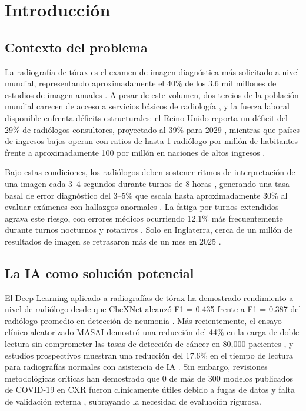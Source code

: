 \section{Introducci\'on}
\label{sec:introduction}

\subsection{Contexto del problema}

La radiograf\'ia de t\'orax es el examen de imagen diagn\'ostica m\'as solicitado a nivel mundial, representando aproximadamente el 40\% de los 3.6 mil millones de estudios de imagen anuales \cite{who2016xray, ahmad2023cxr}. A pesar de este volumen, dos tercios de la poblaci\'on mundial carecen de acceso a servicios b\'asicos de radiolog\'ia \cite{who2023imaging}, y la fuerza laboral disponible enfrenta d\'eficits estructurales: el Reino Unido reporta un d\'eficit del 29\% de radi\'ologos consultores, proyectado al 39\% para 2029 \cite{rcr2025census}, mientras que pa\'ises de ingresos bajos operan con ratios de hasta 1 radi\'ologo por mill\'on de habitantes frente a aproximadamente 100 por mill\'on en naciones de altos ingresos \cite{mollura2020ai}.

Bajo estas condiciones, los radi\'ologos deben sostener ritmos de interpretaci\'on de una imagen cada 3--4 segundos durante turnos de 8 horas \cite{mcdonald2015workload}, generando una tasa basal de error diagn\'ostico del 3--5\% que escala hasta aproximadamente 30\% al evaluar ex\'amenes con hallazgos anormales \cite{bruno2015error, brady2017error}. La fatiga por turnos extendidos agrava este riesgo, con errores m\'edicos ocurriendo 12.1\% m\'as frecuentemente durante turnos nocturnos y rotativos \cite{ahrq2024fatigue}. Solo en Inglaterra, cerca de un mill\'on de resultados de imagen se retrasaron m\'as de un mes en 2025 \cite{rcr2025census}.

\subsection{La IA como soluci\'on potencial}

El Deep Learning aplicado a radiograf\'ias de t\'orax ha demostrado rendimiento a nivel de radi\'ologo desde que CheXNet alcanz\'o F1 = 0.435 frente a F1 = 0.387 del radi\'ologo promedio en detecci\'on de neumon\'ia \cite{rajpurkar2017chexnet}. M\'as recientemente, el ensayo cl\'inico aleatorizado MASAI demostr\'o una reducci\'on del 44\% en la carga de doble lectura sin comprometer las tasas de detecci\'on de c\'ancer en 80,000 pacientes \cite{lang2023masai}, y estudios prospectivos muestran una reducci\'on del 17.6\% en el tiempo de lectura para radiograf\'ias normales con asistencia de IA \cite{shin2023ai}. Sin embargo, revisiones metodol\'ogicas cr\'iticas han demostrado que 0 de m\'as de 300 modelos publicados de COVID-19 en CXR fueron cl\'inicamente \'utiles debido a fugas de datos y falta de validaci\'on externa \cite{roberts2021pitfalls}, subrayando la necesidad de evaluaci\'on rigurosa.

